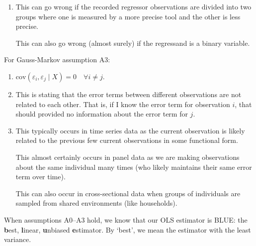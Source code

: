 \documentclass[12pt,twoside]{article}
\begin{document}
\begin{problems}
\begin{problemparts}
\begin{enumerate}[label=\textbf{\roman*})]
    \item This can go wrong if the recorded regressor observations are divided 
        into two groups where one is measured by a more precise tool and the
        other is less precise.
        
        This can also go wrong (almost surely) if the regressand is a binary
        variable.
        
\end{enumerate}

\problempart %

For Gauss-Markov assumption A3:

\begin{enumerate}[label=\textbf{\roman*})]

    \item $\mathrm{cov}(\varepsilon_i, \varepsilon_j \mid X) = 0\quad \forall i 
        \neq j$.
    
    \item This is stating that the error terms between different observations 
        are not related to each other. That is, if I know the error term for 
        observation $i$, that should provided no information about the error
        term for $j$.
    
    \item This typically occurs in time series data as the current observation
        is likely related to the previous few current observations in some
        functional form.
        
        This almost certainly occurs in panel data as we are making observations
        about the same individual many times (who likely maintains their same 
        error term over time).
        
        This can also occur in cross-sectional data when groups of individuals
        are sampled from shared environments (like households).
    
\end{enumerate}

\end{problemparts}

\problem  %

When assumptions A0--A3 hold, we know that our OLS estimator is BLUE: the {\bf 
b}est, {\bf l}inear, {\bf u}nbiased {\bf e}stimator. By `best', we mean the
estimator with the least variance.

\problem  %


\end{problems}
\end{document}
